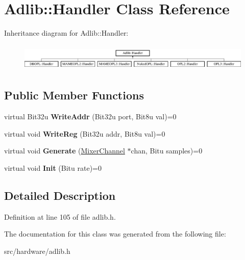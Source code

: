 \hypertarget{classAdlib_1_1Handler}{\section{Adlib\-:\-:Handler Class Reference}
\label{classAdlib_1_1Handler}
}
Inheritance diagram for Adlib\-:\-:Handler\-:\begin{figure}[H]
\begin{center}
\leavevmode
\includegraphics[height=1.314554cm]{classAdlib_1_1Handler}
\end{center}
\end{figure}
\subsection*{Public Member Functions}
\begin{DoxyCompactItemize}
\item 
\hypertarget{classAdlib_1_1Handler_aecfd94a9fc9c688bdb4029610f12cc8f}{virtual Bit32u {\bfseries Write\-Addr} (Bit32u port, Bit8u val)=0}\label{classAdlib_1_1Handler_aecfd94a9fc9c688bdb4029610f12cc8f}

\item 
\hypertarget{classAdlib_1_1Handler_a002f7eb216a517e9e1afa258fd9646fc}{virtual void {\bfseries Write\-Reg} (Bit32u addr, Bit8u val)=0}\label{classAdlib_1_1Handler_a002f7eb216a517e9e1afa258fd9646fc}

\item 
\hypertarget{classAdlib_1_1Handler_a1bde8d54a3e567e256b969c5ae1c3e3c}{virtual void {\bfseries Generate} (\hyperlink{classMixerChannel}{Mixer\-Channel} $\ast$chan, Bitu samples)=0}\label{classAdlib_1_1Handler_a1bde8d54a3e567e256b969c5ae1c3e3c}

\item 
\hypertarget{classAdlib_1_1Handler_acfb5d8e5e01a30b2ffb6efe99be71844}{virtual void {\bfseries Init} (Bitu rate)=0}\label{classAdlib_1_1Handler_acfb5d8e5e01a30b2ffb6efe99be71844}

\end{DoxyCompactItemize}


\subsection{Detailed Description}


Definition at line 105 of file adlib.\-h.



The documentation for this class was generated from the following file\-:\begin{DoxyCompactItemize}
\item 
src/hardware/adlib.\-h\end{DoxyCompactItemize}
